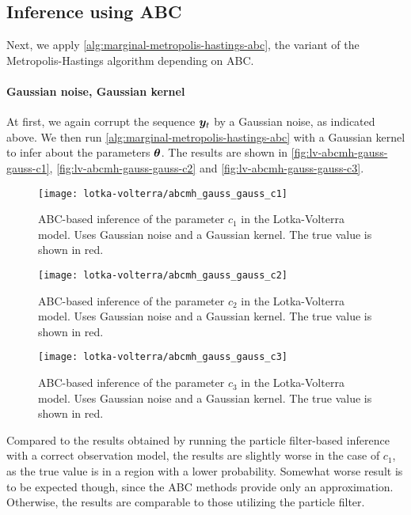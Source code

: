 \subsection{Inference using ABC}
Next, we apply \autoref{alg:marginal-metropolis-hastings-abc}, the variant of the Metropolis-Hastings algorithm depending on ABC.

\paragraph{Gaussian noise, Gaussian kernel}
At first, we again corrupt the sequence $\bm{y}_t$ by a Gaussian noise, as indicated above. We then run \autoref{alg:marginal-metropolis-hastings-abc} with a Gaussian kernel to infer about the parameters $\bm{\theta}$. The results are shown in \autoref{fig:lv-abcmh-gauss-gauss-c1}, \autoref{fig:lv-abcmh-gauss-gauss-c2} and \autoref{fig:lv-abcmh-gauss-gauss-c3}.

\begin{figure}[htp]
    \centering
    \texttt{[image: lotka-volterra/abcmh\_gauss\_gauss\_c1]}
    \caption{ABC-based inference of the parameter $c_1$ in the Lotka-Volterra model. Uses Gaussian noise and a Gaussian kernel. The true value is shown in red.}
    \label{fig:lv-abcmh-gauss-gauss-c1}
\end{figure}

\begin{figure}[htp]
    \centering
    \texttt{[image: lotka-volterra/abcmh\_gauss\_gauss\_c2]}
    \caption{ABC-based inference of the parameter $c_2$ in the Lotka-Volterra model. Uses Gaussian noise and a Gaussian kernel. The true value is shown in red.}
    \label{fig:lv-abcmh-gauss-gauss-c2}
\end{figure}

\begin{figure}[htp]
    \centering
    \texttt{[image: lotka-volterra/abcmh\_gauss\_gauss\_c3]}
    \caption{ABC-based inference of the parameter $c_3$ in the Lotka-Volterra model. Uses Gaussian noise and a Gaussian kernel. The true value is shown in red.}
    \label{fig:lv-abcmh-gauss-gauss-c3}
\end{figure}

Compared to the results obtained by running the particle filter-based inference with a correct observation model, the results are slightly worse in the case of $c_1$, as the true value is in a region with a lower probability. Somewhat worse result is to be expected though, since the ABC methods provide only an approximation. Otherwise, the results are comparable to those utilizing the particle filter.


